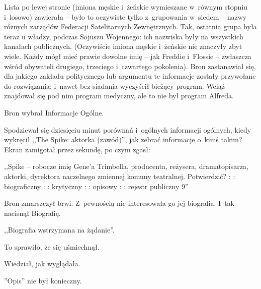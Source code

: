 \documentclass[oneside,polish,11pt,rmheadings]{mwbk}
\begin{document}
Lista po lewej stronie (imiona męskie i~żeńskie wymieszane w~równym stopniu i~losowo) zawierała -- było to oczywiste tylko z~grupowania w~siedem -- nazwy różnych zarządów Federacji Satelitarnych Zewnętrznych. Tak, ostatnia grupa była teraz u władzy, podczas Sojuszu Wojennego: ich nazwiska były na wszystkich kanałach publicznych.  (Oczywiście imiona męskie i~żeńskie nie znaczyły zbyt wiele. Każdy mógł mieć prawie dowolne imię -- jak Freddie i~Flossie -- zwłaszcza wśród obywateli drugiego, trzeciego i~czwartego pokolenia). Bron zastanawiał się, dla jakiego zakładu politycznego lub argumentu te informacje zostały przywołane do rozwiązania; i~nawet bez siadania wyczyścił bieżący program. Wciąż znajdował się pod nim program medyczny, ale to nie był program Alfreda. 

Bron wybrał Informacje Ogólne. 

Spodziewał się dziesięciu minut porównań i~ogólnych informacji ogólnych, kiedy wykręcił ,,The Spike: aktorka (zawód)'', jak zebrać informacje o~kimś takim? Ekran zamigotał przez sekundę, po czym zgasł: 

,,Spike -- robocze imię Gene'a Trimbella, producenta, reżysera, dramatopisarza, aktorki, dyrektora naczelnego zmiennej komuny teatralnej. Potwierdzić? : : biograficzny : : krytyczny : : opisowy : : rejestr publiczny 9'' 

Bron zmarszczył brwi. Z~pewnością nie interesowała go jej biografia. I~tak nacisnął Biografię. 

,,Biografia wstrzymana na żądanie''. 

To sprawiło, że się uśmiechnął. 

Wiedział, jak wyglądała. 

''Opis'' nie był konieczny. 
\end{document}
